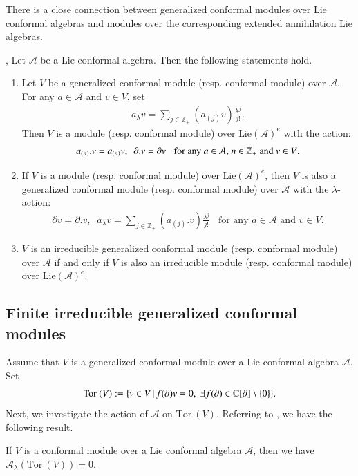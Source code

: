 \documentclass[12pt]{amsart}
\begin{document}
There is a close connection between generalized conformal modules over Lie conformal algebras and modules over the corresponding extended annihilation Lie algebras.

\begin{pro}\label{pro-3}\cite[Remark 2.9a]{K1}, \cite[Proposition 2.1, Corollary 2.1]{CK}
Let $\mathcal{A}$ be a Lie conformal algebra. Then the following statements hold.
\begin{enumerate}
\item \label{a1}Let $V$ be a generalized conformal module (resp. conformal module) over $\mathcal{A}$. For any $a\in \mathcal{A}$ and $v\in V$, set
\begin{eqnarray*}
 a_\lambda v=\sum_{j\in \mathbb{Z}_+}(a_{(j)}v)\frac{\lambda^j}{j!}.
 \end{eqnarray*}
Then $V$ is a module (resp. conformal module) over $\text{Lie}( \mathcal{A})^e$ with the action:
\begin{eqnarray}
a_{(n)}. v=a_{(n)}v,\ \ \partial. v=\partial v\;\;\;\text{for any $a\in \mathcal{A}$, $n\in \mathbb{Z}_+$ and $v\in V$.}
\end{eqnarray}
\item \label{a2}If $V$ is a module (resp. conformal module) over $\text{Lie}( \mathcal{A})^e$, then $V$ is also a generalized conformal module (resp. conformal module) over $\mathcal{A}$ with the $\lambda$-action:
\begin{eqnarray}\label{eq-2}
 \partial v=\partial.v,\;\;a_\lambda v=\sum_{j\in \mathbb{Z}_+}(a_{(j)}.v)\frac{\lambda^j}{j!}\;\;\;\text{for any $a\in \mathcal{A}$ and $v\in V$.}
\end{eqnarray}
\item \label{a3}$V$ is an irreducible generalized conformal module (resp. conformal module) over $\mathcal{A}$ if and only if $V$ is also an irreducible module (resp. conformal module) over $\text{Lie}( \mathcal{A})^e$.
\end{enumerate}
\end{pro}
\subsection{Finite irreducible generalized conformal modules}
Assume that $V$ is a generalized conformal module over a Lie conformal algebra $\mathcal{A}$.
Set
 $$\text{Tor}~(V):=\{v\in V\,|\,f(\partial)v=0,\ \exists f(\partial)\in\mathbb{C}[\partial]\setminus\{0\}\}.$$
Next, we investigate the action of $\mathcal{A}$ on $\text{Tor}~(V)$. Referring to \cite{DK}, we have the following result.
\begin{pro}\cite{DK}
If $V$ is a conformal module over a Lie conformal algebra $\mathcal{A}$, then we have
$\mathcal{A}_\lambda (\text{Tor}~(V))=0$.
\end{pro}
\end{document}
